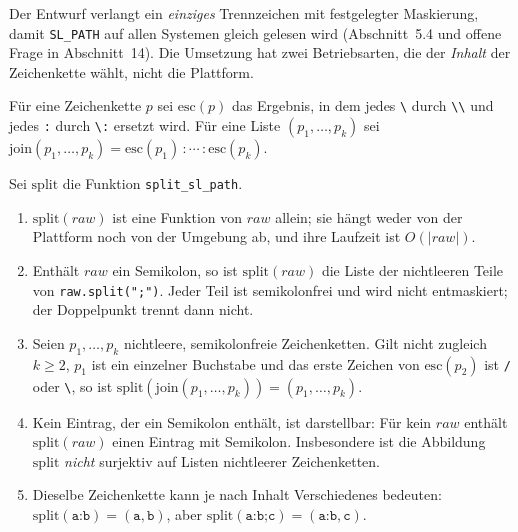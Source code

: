 Der Entwurf verlangt ein \emph{einziges} Trennzeichen mit festgelegter Maskierung, damit \texttt{SL\_PATH} auf allen Systemen gleich gelesen wird (Abschnitt~5.4 und offene Frage in Abschnitt~14). Die Umsetzung hat zwei Betriebsarten, die der \emph{Inhalt} der Zeichenkette wählt, nicht die Plattform.

\begin{definition}
	Für eine Zeichenkette $p$ sei $\mathrm{esc}(p)$ das Ergebnis, in dem jedes \texttt{\textbackslash} durch \texttt{\textbackslash\textbackslash} und jedes \texttt{:} durch \texttt{\textbackslash:} ersetzt wird. Für eine Liste $(p_1,\ldots,p_k)$ sei $\mathrm{join}(p_1,\ldots,p_k)=\mathrm{esc}(p_1)\,\texttt{:}\,\cdots\,\texttt{:}\,\mathrm{esc}(p_k)$.
\end{definition}

\begin{satz}
	\label{satz:split}
	Sei $\mathrm{split}$ die Funktion \texttt{split\_sl\_path}.
	\begin{enumerate}[label=(\alph*)]
		\item $\mathrm{split}(\mathit{raw})$ ist eine Funktion von $\mathit{raw}$ allein; sie hängt weder von der Plattform noch von der Umgebung ab, und ihre Laufzeit ist $O(|\mathit{raw}|)$.
		\item Enthält $\mathit{raw}$ ein Semikolon, so ist $\mathrm{split}(\mathit{raw})$ die Liste der nichtleeren Teile von \texttt{raw.split(";")}. Jeder Teil ist semikolonfrei und wird nicht entmaskiert; der Doppelpunkt trennt dann nicht.
		\item Seien $p_1,\ldots,p_k$ nichtleere, semikolonfreie Zeichenketten. Gilt nicht zugleich $k\ge2$, $p_1$ ist ein einzelner Buchstabe und das erste Zeichen von $\mathrm{esc}(p_2)$ ist \texttt{/} oder \texttt{\textbackslash}, so ist $\mathrm{split}(\mathrm{join}(p_1,\ldots,p_k))=(p_1,\ldots,p_k)$.
		\item Kein Eintrag, der ein Semikolon enthält, ist darstellbar: Für kein $\mathit{raw}$ enthält $\mathrm{split}(\mathit{raw})$ einen Eintrag mit Semikolon. Insbesondere ist die Abbildung $\mathrm{split}$ \emph{nicht} surjektiv auf Listen nichtleerer Zeichenketten.
		\item Dieselbe Zeichenkette kann je nach Inhalt Verschiedenes bedeuten: $\mathrm{split}(\texttt{a:b})=(\texttt{a},\texttt{b})$, aber $\mathrm{split}(\texttt{a:b;c})=(\texttt{a:b},\texttt{c})$.
	\end{enumerate}
\end{satz}

